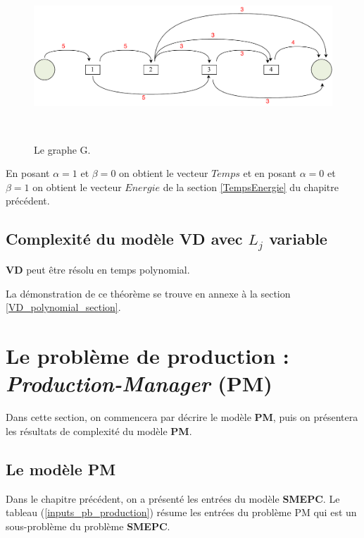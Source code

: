 {\begin{Example}
		\begin{figure}[H]
		\centerline{
			\includegraphics[height=6.3cm]{images_these/G_Graph.pdf}}
		\caption[Le graphe G]{Le graphe G.}
		\label{G_graph}
	\end{figure}
\end{Example}

\begin{Rem}
	En posant $\alpha =1$ et $\beta=0$ on obtient le vecteur $Temps$ et en posant $\alpha=0$ et $\beta=1$ on obtient le vecteur $Energie$ de la section \ref{TempsEnergie} du chapitre précédent.
\end{Rem}
}
\subsection{Complexité du modèle VD avec $L_j$ variable}
\begin{theo}
	\label{VD_polynomial}
	\textbf{VD} peut être résolu en temps polynomial.
\end{theo}
La démonstration de ce théorème se trouve en annexe à la section \ref{VD_polynomial_section}.

\section{Le problème de production : \textit{Production-Manager} (PM)}
\label{modele_PM}
Dans cette section, on commencera par décrire le modèle \textbf{PM}, puis on présentera les résultats de complexité du modèle \textbf{PM}.
\subsection{Le modèle PM}
Dans le chapitre précédent, on a présenté les entrées du modèle \textbf{SMEPC}. Le tableau (\ref{inputs_pb_production}) résume les entrées du problème PM qui est un sous-problème du problème \textbf{SMEPC}.

